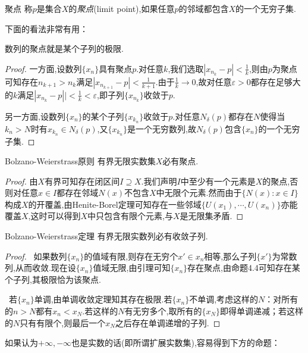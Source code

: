 \begin{definition}{聚点}
	称$p$是集合$X$的\textit{聚点}(limit point),如果任意$p$的邻域都包含$X$的一个无穷子集.
\end{definition}

下面的看法非常有用：

\begin{proposition}{}
	数列的聚点就是某个子列的极限.
\end{proposition}
\begin{proof}
	一方面,设数列$\{ x_n \}$具有聚点$p$.对任意$k$,我们选取$|x_{n_k}-p|<\frac{1}{k}$,则由$p$为聚点可知存在$n_{k+1}>n_k$满足$|x_{n_{k+1}}-p|<\frac{1}{k+1}$.由于$\frac{1}{k} \to 0$,故对任意$\varepsilon >0$都存在足够大的$k$满足$|x_{n_k}-p||<\frac{1}{k}<\varepsilon$,即子列$\{ x_{n_k} \}$收敛于$p$.
	
	另一方面,设数列$\{ x_n \}$的某个子列$\{ x_{k_n} \}$收敛于$p$.对任意$N_{\delta}(p)$都存在$N$使得当$k_n>N$时有$x_{k_n} \in N_{\delta}(p)$,又$\{ x_{k_n} \}$是一个无穷数列,故$N_{\delta}(p)$包含$\{ x_n \}$的一个无穷子集.
\end{proof}

\begin{lemma}{Bolzano-Weierstrass原则}
	有界无限实数集$X$必有聚点.
\end{lemma}
\begin{proof}
	由$X$有界可知存在闭区间$I \supseteq X$.我们声明$I$中至少有一个元素是$X$的聚点,否则对任意$x \in I$都存在邻域$N(x)$不包含$X$中无限个元素.然而由于$\{ N(x):x \in I \}$构成$X$的开覆盖,由Henite-Borel定理可知存在一些邻域$\{ U(x_1),\cdots ,U(x_n) \}$亦能覆盖$X$,这时可以得到$X$中只包含有限个元素,与$X$是无限集矛盾.
\end{proof}

\begin{theorem}{Bolzano-Weierstrass定理}
	有界无限实数列必有收敛子列.
\end{theorem}
\begin{proof}
	~如果数列$\{ x_n \}$的值域有限,则存在无穷个$x' \in x_n$相等,那么子列$\{ x' \}$为常数列,从而收敛.现在设$\{ x_n \}$值域无限,由引理可知$\{ x_n \}$存在聚点,由命题4.4可知存在某个子列,其极限恰为该聚点.
	
	~若$\{ x_n \}$单调,由单调收敛定理知其存在极限.若$\{ x_n \}$不单调,考虑这样的$N$：对所有的$n>N$都有$x_n<x_N$.若这样的$N$有无穷多个,取所有的$\{ x_N \}$即得单调递减；若这样的$N$只有有限个,则最后一个$x_N$之后存在单调递增的子列.
\end{proof}

如果认为$+\infty ,-\infty$也是实数的话(即所谓扩展实数集),容易得到下方的命题：

